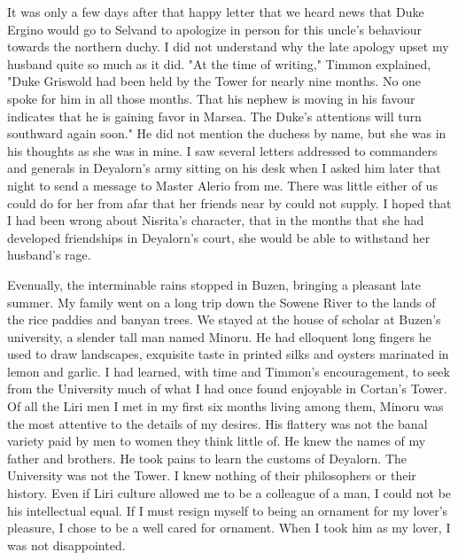 \documentclass{article}
\begin{document}
It was only a few days after that happy letter that we heard news that Duke Ergino would go to Selvand to apologize in person for this uncle's behaviour towards the northern duchy. I did not understand why the late apology upset my husband quite so much as it did. "At the time of writing," Timmon explained, "Duke Griswold had been held by the Tower for nearly nine months. No one spoke for him in all those months. That his nephew is moving in his favour indicates that he is gaining favor in Marsea. The Duke's attentions will turn southward again soon." He did not mention the duchess by name, but she was in his thoughts as she was in mine. I saw several letters addressed to commanders and generals in Deyalorn's army sitting on his desk when I asked him later that night to send a message to Master Alerio from me. There was little either of us could do for her from afar that her friends near by could not supply. I hoped that I had been wrong about Nisrita's character, that in the months that she had developed friendships in Deyalorn's court, she would be able to withstand her husband's rage. 

Evenually, the interminable rains stopped in Buzen, bringing a pleasant late summer. My family went on a long trip down the Sowene River to the lands of the rice paddies and banyan trees. We stayed at the house of scholar at Buzen's university, a slender tall man named Minoru. He had elloquent long fingers he used to draw landscapes, exquisite taste in printed silks and oysters marinated in lemon and garlic. I had learned, with time and Timmon's encouragement, to seek from the University much of what I had once found enjoyable in Cortan's Tower. Of all the Liri men I met in my first six months living among them, Minoru was the most attentive to the details of my desires. His flattery was not the banal variety paid by men to women they think little of. He knew the names of my father and brothers. He took pains to learn the customs of Deyalorn. The University was not the Tower. I knew nothing of their philosophers or their history. Even if Liri culture allowed me to be a colleague of a man, I could not be his intellectual equal. If I must resign myself to being an ornament for my lover's pleasure, I chose to be a well cared for ornament. When I took him as my lover, I was not disappointed.
\end{document}
